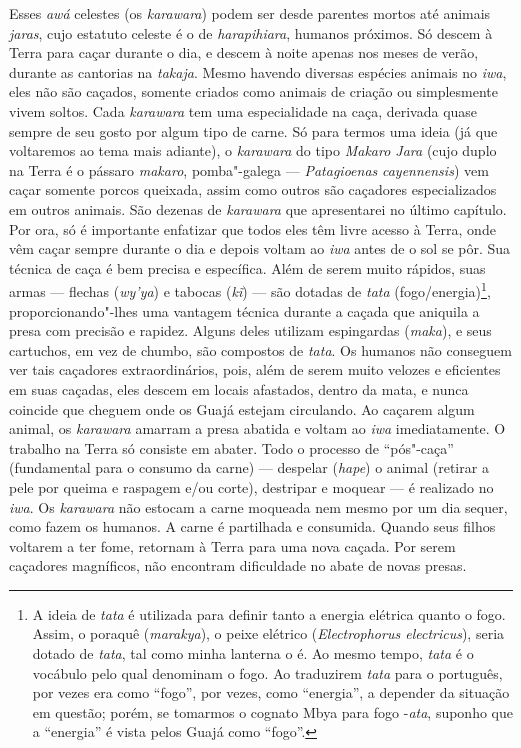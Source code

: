 Esses \emph{awá} celestes (os \emph{karawara}) podem ser desde parentes
mortos até animais \emph{jaras}, cujo estatuto celeste é o de
\emph{harapihiara}, humanos próximos. Só descem à Terra para caçar
durante o dia, e descem à noite apenas nos meses de verão, durante as
cantorias na \emph{takaja}. Mesmo havendo diversas espécies animais no
\emph{iwa}, eles não são caçados, somente criados como animais de
criação ou simplesmente vivem soltos. Cada \emph{karawara} tem uma
especialidade na caça, derivada quase sempre de seu gosto por algum tipo
de carne. Só para termos uma ideia (já que voltaremos ao tema mais
adiante), o \emph{karawara} do tipo \emph{Makaro Jara} (cujo duplo na
Terra é o pássaro \emph{makaro}, pomba"-galega --- \emph{Patagioenas}
\emph{cayennensis}) vem caçar somente porcos queixada, assim como outros
são caçadores especializados em outros animais. São dezenas de
\emph{karawara} que apresentarei no último capítulo. Por ora, só é
importante enfatizar que todos eles têm livre acesso à Terra, onde vêm
caçar sempre durante o dia e depois voltam ao \emph{iwa} antes de o
sol se pôr. Sua técnica de caça é bem precisa e específica. Além de
serem muito rápidos, suas armas --- flechas (\emph{wy'ya}) e tabocas
(\emph{kĩ}) --- são dotadas de \emph{tata} (fogo/energia)\footnote{A ideia
  de \emph{tata} é utilizada para definir tanto a energia elétrica
  quanto o fogo. Assim, o poraquê (\emph{marakya}), o peixe elétrico
  (\emph{Electrophorus electricus}), seria dotado de \emph{tata}, tal
  como minha lanterna o é. Ao mesmo tempo, \emph{tata} é o vocábulo pelo
  qual denominam o fogo. Ao traduzirem \emph{tata} para o português, por
  vezes era como ``fogo'', por vezes, como ``energia'', a depender da
  situação em questão; porém, se tomarmos o cognato Mbya para fogo
  -\emph{ata}, suponho que a ``energia'' é vista pelos Guajá como ``fogo''.},
proporcionando"-lhes uma vantagem técnica durante a caçada que aniquila a
presa com precisão e rapidez. Alguns deles utilizam espingardas
(\emph{maka}), e seus cartuchos, em vez de chumbo, são compostos de
\emph{tata}. Os humanos não conseguem ver tais caçadores
extraordinários, pois, além de serem muito velozes e eficientes em suas
caçadas, eles descem em locais afastados, dentro da mata, e nunca
coincide que cheguem onde os Guajá estejam circulando. Ao caçarem algum
animal, os \emph{karawara} amarram a presa abatida e voltam ao
\emph{iwa} imediatamente. O trabalho na Terra só consiste em abater.
Todo o processo de ``pós"-caça'' (fundamental para o consumo da carne) ---
despelar (\emph{hape}) o animal (retirar a pele por queima e raspagem
e/ou corte), destripar e moquear --- é realizado no \emph{iwa}. Os
\emph{karawara} não estocam a carne moqueada nem mesmo por um dia
sequer, como fazem os humanos. A carne é partilhada e consumida. Quando
seus filhos voltarem a ter fome, retornam à Terra para uma nova caçada.
Por serem caçadores magníficos, não encontram dificuldade no abate de
novas presas.

